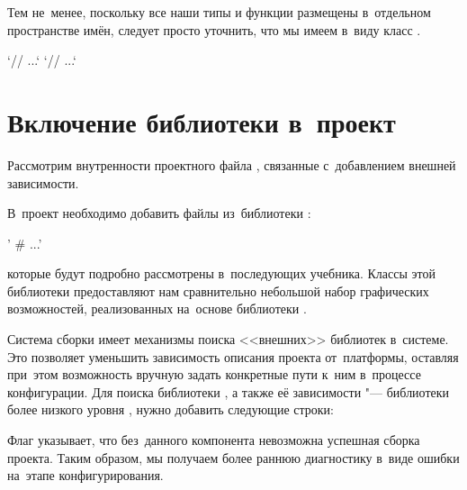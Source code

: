 Тем не~менее, поскольку все наши типы и функции размещены в~отдельном пространстве имён, следует просто уточнить, что мы имеем в~виду класс .

\cpp`// ...`
\cpp`// ...`



\section{Включение библиотеки  в~проект}
Рассмотрим внутренности проектного файла , связанные с~добавлением внешней зависимости.

В~проект необходимо добавить файлы из~библиотеки :

\cmake'    # ...'

\noindent которые будут подробно рассмотрены в~последующих  учебника. Классы этой библиотеки предоставляют нам сравнительно небольшой набор графических возможностей, реализованных на~основе библиотеки .

Система сборки  имеет механизмы поиска <<внешних>> библиотек в~системе. Это позволяет уменьшить зависимость описания проекта от~платформы, оставляя при~этом возможность вручную задать конкретные пути к~ним в~процессе конфигурации. Для поиска библиотеки , а также её зависимости "--- библиотеки более низкого уровня , нужно добавить следующие строки:


\noindent Флаг  указывает, что без~данного компонента невозможна успешная сборка проекта. Таким образом, мы получаем более раннюю диагностику в~виде ошибки на~этапе конфигурирования.




